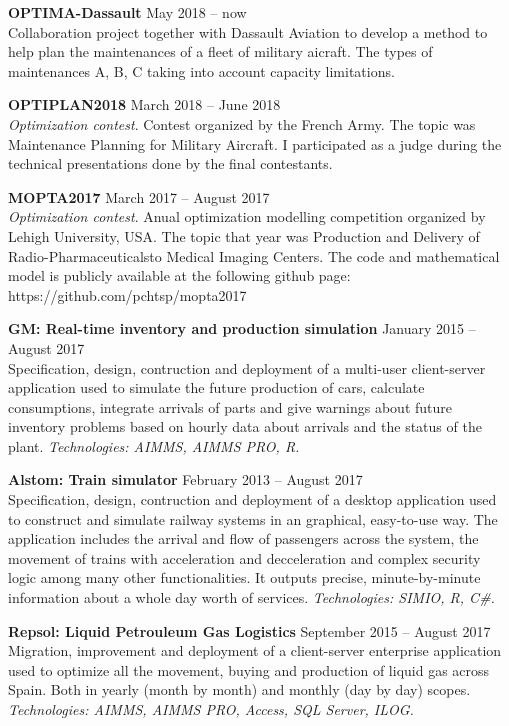 \textbf{OPTIMA-Dassault} 
	\hfill May 2018 -- now\\
		Collaboration project together with Dassault Aviation to develop a method to help plan the maintenances of a fleet of military aicraft. The types of maintenances A, B, C taking into account capacity limitations.

\textbf{OPTIPLAN2018} 
	\hfill March 2018 -- June 2018\\
		\textsl{Optimization contest}. Contest organized by the French Army. The topic was Maintenance Planning for Military Aircraft. I participated as a judge during the technical presentations done by the final contestants.

\textbf{MOPTA2017} 	
	\hfill March 2017 -- August 2017\\
		\textsl{Optimization contest}. Anual optimization modelling competition organized by Lehigh University, USA. The topic that year was Production and Delivery of Radio-Pharmaceuticalsto Medical Imaging Centers. The code and mathematical model is publicly available at the following github page:\\
		https://github.com/pchtsp/mopta2017

\textbf{GM: Real-time inventory and production simulation} 
	\hfill January 2015 -- August 2017\\
Specification, design, contruction and deployment of a multi-user client-server application used to simulate the future production of cars, calculate consumptions, integrate arrivals of parts and give warnings about future inventory problems based on hourly data about arrivals and the status of the plant.
\textsl{Technologies: AIMMS, AIMMS PRO, R.}

\textbf{Alstom: Train simulator} 
	\hfill February 2013 -- August 2017\\
Specification, design, contruction and deployment of a desktop application used to construct and simulate railway systems in an graphical, easy-to-use way. The application includes the arrival and flow of passengers across the system, the movement of trains with acceleration and decceleration and complex security logic among many other functionalities. It outputs precise, minute-by-minute information about a whole day worth of services.
\textsl{Technologies: SIMIO, R, C\#.}

\textbf{Repsol: Liquid Petrouleum Gas Logistics} 
	\hfill September 2015 -- August 2017\\
Migration, improvement and deployment of a client-server enterprise application used to optimize all the movement, buying and production of liquid gas across Spain. Both in yearly (month by month) and monthly (day by day) scopes.
\textsl{Technologies: AIMMS, AIMMS PRO, Access, SQL Server, ILOG.}

